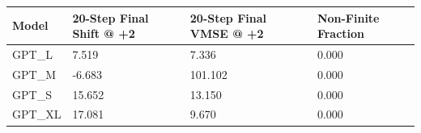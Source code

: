 \begin{tabular}{llll}
\toprule
Model & 20-Step Final Shift @ +2 & 20-Step Final VMSE @ +2 & Non-Finite Fraction \\
\midrule
GPT\_L & 7.519 & 7.336 & 0.000 \\
GPT\_M & -6.683 & 101.102 & 0.000 \\
GPT\_S & 15.652 & 13.150 & 0.000 \\
GPT\_XL & 17.081 & 9.670 & 0.000 \\
\bottomrule
\end{tabular}
